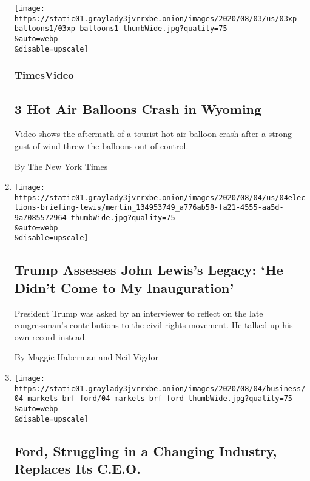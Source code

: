 \begin{enumerate}
  \texttt{[image: https://static01.graylady3jvrrxbe.onion/images/2020/08/03/us/03xp-balloons1/03xp-balloons1-thumbWide.jpg?quality=75\\\&auto=webp\\\&disable=upscale]}

  \hypertarget{timesvideo-1}{%
  \subsubsection{TimesVideo}\label{timesvideo-1}}

  \hypertarget{3-hot-air-balloons-crash-in-wyoming}{%
  \subsection{3 Hot Air Balloons Crash in
  Wyoming}\label{3-hot-air-balloons-crash-in-wyoming}}

  Video shows the aftermath of a tourist hot air balloon crash after a
  strong gust of wind threw the balloons out of control.

  By The New York Times
\item
  \href{/2020/08/04/us/politics/trump-john-lewis-axios.html}{}

  \texttt{[image: https://static01.graylady3jvrrxbe.onion/images/2020/08/04/us/04elections-briefing-lewis/merlin\_134953749\_a776ab58-fa21-4555-aa5d-9a7085572964-thumbWide.jpg?quality=75\\\&auto=webp\\\&disable=upscale]}

  \hypertarget{trump-assesses-john-lewiss-legacy-he-didnt-come-to-my-inauguration}{%
  \subsection{Trump Assesses John Lewis's Legacy: `He Didn't Come to My
  Inauguration'}\label{trump-assesses-john-lewiss-legacy-he-didnt-come-to-my-inauguration}}

  President Trump was asked by an interviewer to reflect on the late
  congressman's contributions to the civil rights movement. He talked up
  his own record instead.

  By Maggie Haberman and Neil Vigdor
\item
  \href{/2020/08/04/business/ford-jim-hackett-james-farley.html}{}

  \texttt{[image: https://static01.graylady3jvrrxbe.onion/images/2020/08/04/business/04-markets-brf-ford/04-markets-brf-ford-thumbWide.jpg?quality=75\\\&auto=webp\\\&disable=upscale]}

  \hypertarget{ford-struggling-in-a-changing-industry-replaces-its-ceo}{%
  \subsection{Ford, Struggling in a Changing Industry, Replaces Its
  C.E.O.}\label{ford-struggling-in-a-changing-industry-replaces-its-ceo}}


\end{enumerate}
